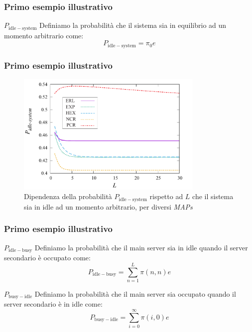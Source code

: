 \documentclass{beamer}
\begin{document}
    \begin{frame}
    \frametitle{Primo esempio illustrativo}
    \begin{block}{$P_{\mathrm{idle-system}}$}
        Definiamo la probabilità che il sistema sia in equilibrio ad un momento arbitrario come:
        $$  P_{\mathrm{idle-system}} = \pi_0 e $$
    \end{block}
\end{frame}


\begin{frame}
    \frametitle{Primo esempio illustrativo}
    \begin{figure}[h]
        \centering
        \includegraphics[width=0.8\textwidth]{pSUZiNk.png}
        \caption{Dipendenza della probabilità $P_{\mathrm{idle-system}}$ rispetto ad $L$ che il sistema sia in idle ad un momento arbitrario, per diversi \emph{MAPs}}
        \label{fig:3}
    \end{figure}
\end{frame}



\begin{frame}
    \frametitle{Primo esempio illustrativo}
    \begin{block}{$P_{\mathrm{idle-busy}}$}
        Definiamo la probabilità che il main server sia in idle quando il server secondario è occupato come:
        $$ P_{\mathrm{idle-busy}} = \sum_{n=1}^{L} \pi(n,n) e $$
    \end{block}
    \begin{block}{$P_{\mathrm{busy-idle}}$}
        Definiamo la probabilità che il main server sia occupato quando il server secondario è in idle come:
        $$ P_{\mathrm{busy-idle}} = \sum_{i=0}^{\infty} \pi(i,0) e $$
    \end{block}
\end{frame}
\end{document}

